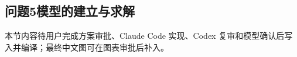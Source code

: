 \subsection{问题5模型的建立与求解}\label{sub:5.5}

本节内容待用户完成方案审批、Claude Code 实现、Codex 复审和模型确认后写入并编译；最终中文图可在图表审批后补入。
